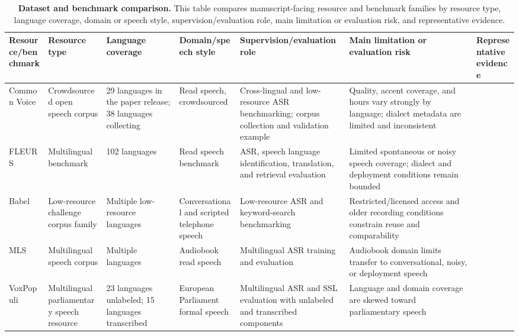 \documentclass[pdflatex,sn-basic]{sn-jnl}
\theoremstyle{thmstyleone}
\theoremstyle{thmstyletwo}
\theoremstyle{thmstylethree}
\begin{document}
\begin{table}[htbp]
\setcounter{table}{1}
\footnotesize
\centering
\caption{\textbf{Dataset and benchmark comparison.} This table compares manuscript-facing resource and benchmark families by resource type, language coverage, domain or speech style, supervision/evaluation role, main limitation or evaluation risk, and representative evidence.}
\label{tab:2}
\begin{tabularx}{\textwidth}{YYYYYYY}
\toprule
\textbf{Resource/benchmark} & \textbf{Resource type} & \textbf{Language coverage} & \textbf{Domain/speech style} & \textbf{Supervision/evaluation role} & \textbf{Main limitation or evaluation risk} & \textbf{Representative evidence} \\
\midrule
Common Voice & Crowdsourced open speech corpus & 29 languages in the paper release; 38 languages collecting & Read speech, crowdsourced & Cross-lingual and low-resource ASR benchmarking; corpus collection and validation example & Quality, accent coverage, and hours vary strongly by language; dialect metadata are limited and inconsistent & \citep{ardila2020commonvoice} \\
FLEURS & Multilingual benchmark & 102 languages & Read speech benchmark & ASR, speech language identification, translation, and retrieval evaluation & Limited spontaneous or noisy speech coverage; dialect and deployment conditions remain bounded & \citep{conneau2022fleurs} \\
Babel & Low-resource challenge corpus family & Multiple low-resource languages & Conversational and scripted telephone speech & Low-resource ASR and keyword-search benchmarking & Restricted/licensed access and older recording conditions constrain reuse and comparability & \citep{gales2014_babel_project_research_cued,peterson2022_openasr21} \\
MLS & Multilingual speech corpus & Multiple languages & Audiobook read speech & Multilingual ASR training and evaluation & Audiobook domain limits transfer to conversational, noisy, or deployment speech & \citep{pratap20_interspeech} \\
VoxPopuli & Multilingual parliamentary speech resource & 23 languages unlabeled; 15 languages transcribed & European Parliament formal speech & Multilingual ASR and SSL evaluation with unlabeled and transcribed components & Language and domain coverage are skewed toward parliamentary speech & \citep{wang2021voxpopuli} \\

\end{tabularx}
\end{table}
\end{document}
